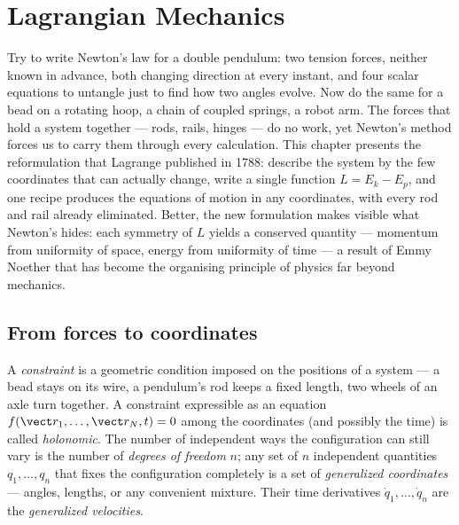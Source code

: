 \chapter{Lagrangian Mechanics}\label{ch:b3:lagrangian-mechanics}

Try to write Newton's law for a double pendulum: two tension forces,
neither known in advance, both changing direction at every instant, and
four scalar equations to untangle just to find how two angles evolve.
Now do the same for a bead on a rotating hoop, a chain of coupled
springs, a robot arm. The forces that hold a system together --- rods,
rails, hinges --- do no work, yet Newton's method forces us to carry
them through every calculation. This chapter presents the reformulation
that Lagrange published in 1788: describe the system by the few
coordinates that can actually change, write a single function
$L = E_k - E_p$, and one recipe produces the equations of motion in any
coordinates, with every rod and rail already eliminated. Better, the
new formulation makes visible what Newton's hides: each symmetry of $L$
yields a conserved quantity --- momentum from uniformity of space,
energy from uniformity of time --- a result of Emmy Noether that has
become the organising principle of physics far beyond mechanics.

\section{From forces to coordinates}

\begin{definition}\label{def:b3:lagrangian-mechanics:coordinates}
A \emph{constraint} is a geometric condition imposed on the positions
of a system --- a bead stays on its wire, a pendulum's rod keeps a fixed
length, two wheels of an axle turn together. A constraint expressible
as an equation $f(\vect r_1, \dots, \vect r_N, t) = 0$ among the
coordinates (and possibly the time) is called \emph{holonomic}. The
number of independent ways the configuration can still vary is the
number of \emph{degrees of freedom} $n$; any set of $n$ independent
quantities $q_1, \dots, q_n$ that fixes the configuration completely is
a set of \emph{generalized coordinates} --- angles, lengths, or any
convenient mixture. Their time derivatives $\dot q_1, \dots, \dot q_n$
are the \emph{generalized velocities}.
\end{definition}

